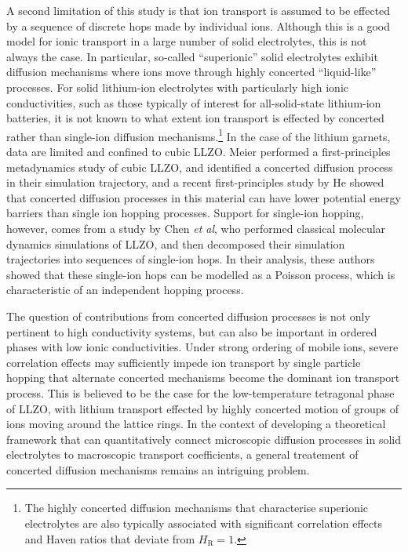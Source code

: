 \documentclass[aps,prb,twocolumn,superscriptaddress,reprint]{revtex4-1}
\begin{document}
A second limitation of this study is that ion transport is assumed to be effected by a sequence of discrete hops made by individual ions. Although this is a good model for ionic transport in a large number of solid electrolytes, this is not always the case. In particular, so-called ``superionic'' solid electrolytes exhibit diffusion mechanisms where ions move through highly concerted ``liquid-like'' processes.\cite{Catlow_AnnRevMaterSci1986,Hull_RepProgPhys2004} For solid lithium-ion electrolytes with particularly high ionic conductivities, such as those typically of interest for  all-solid-state lithium-ion batteries, it is not known to what extent ion transport is effected by concerted rather than single-ion diffusion mechanisms.\footnote{The highly concerted diffusion mechanisms that characterise superionic electrolytes are also typically associated with significant correlation effects and Haven ratios that deviate from $H_\mathrm{R}=1$.\cite{SalanneEtAl_JPhysChemC2012,Hull_RepProgPhys2004}} In the case of the lithium garnets, data are limited and confined to cubic LLZO. Meier \etal performed a first-principles metadynamics study of cubic LLZO, and identified a concerted diffusion process in their simulation trajectory,\cite{MeierEtAl_JPhysChemC2014} and a recent first-principles study by He \etal showed that concerted diffusion processes in this material can have lower potential energy barriers than single ion hopping processes. Support for single-ion hopping, however, comes from a study by Chen \emph{et al}, who performed classical molecular dynamics simulations of LLZO, and then decomposed their simulation trajectories into sequences of single-ion hops.\cite{ChenEtAl_SciRep2017} In their analysis, these authors showed that these single-ion hops can be modelled as a Poisson process, which is characteristic of an independent hopping process.\cite{MorganAndMadden_PhysRevLett2014}

The question of contributions from concerted diffusion processes is not only pertinent to high conductivity systems, but can also be important in ordered phases with low ionic conductivities.\cite{MorganAndMadden_PhysRevLett2014} Under strong ordering of mobile ions, severe correlation effects may sufficiently impede ion transport by single particle hopping that alternate concerted mechanisms become the dominant ion transport process. This is believed to be the case for the low-temperature tetragonal phase of LLZO, with lithium transport effected by highly concerted motion of groups of ions moving around the lattice rings. \cite{BurbanoEtAl_PhysRevLett2016} In the context of developing a theoretical framework that can quantitatively connect microscopic diffusion processes in solid electrolytes to macroscopic transport coefficients, a general treatement of concerted diffusion mechanisms remains an intriguing problem. 
\end{document}
